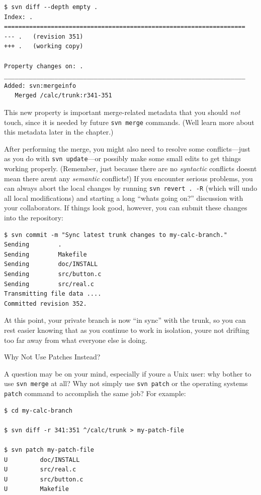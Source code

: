 \begin{verbatim}
$ svn diff --depth empty .
Index: .
===================================================================
--- .   (revision 351)
+++ .   (working copy)

Property changes on: .
___________________________________________________________________
Added: svn:mergeinfo
   Merged /calc/trunk:r341-351
\end{verbatim}

This new property is important merge-related metadata that you should
\emph{not} touch, since it is needed by future \texttt{svn\ merge}
commands. (We\textquotesingle ll learn more about this metadata later in
the chapter.)

After performing the merge, you might also need to resolve some
conflicts---just as you do with \texttt{svn\ update}---or possibly make
some small edits to get things working properly. (Remember, just because
there are no \emph{syntactic} conflicts doesn\textquotesingle t mean
there aren\textquotesingle t any \emph{semantic} conflicts!) If you
encounter serious problems, you can always abort the local changes by
running \texttt{svn\ revert\ .\ -R} (which will undo all local
modifications) and starting a long ``what\textquotesingle s going on?''
discussion with your collaborators. If things look good, however, you
can submit these changes into the repository:

\begin{verbatim}
$ svn commit -m "Sync latest trunk changes to my-calc-branch."
Sending        .
Sending        Makefile
Sending        doc/INSTALL
Sending        src/button.c
Sending        src/real.c
Transmitting file data ....
Committed revision 352.
\end{verbatim}

At this point, your private branch is now ``in sync'' with the trunk, so
you can rest easier knowing that as you continue to work in isolation,
you\textquotesingle re not drifting too far away from what everyone else
is doing.

Why Not Use Patches Instead?

A question may be on your mind, especially if you\textquotesingle re a
Unix user: why bother to use \texttt{svn\ merge} at all? Why not simply
use \texttt{svn\ patch} or the operating system\textquotesingle s
\texttt{patch} command to accomplish the same job? For example:

\begin{verbatim}
$ cd my-calc-branch

$ svn diff -r 341:351 ^/calc/trunk > my-patch-file

$ svn patch my-patch-file
U         doc/INSTALL
U         src/real.c
U         src/button.c
U         Makefile
\end{verbatim}

